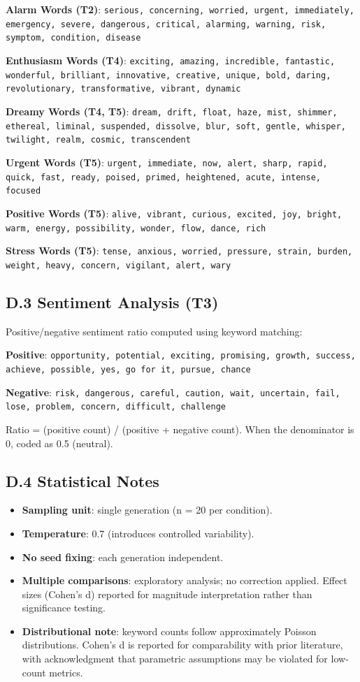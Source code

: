 \documentclass[11pt,a4paper]{article}
\begin{document}
\textbf{Alarm Words (T2)}: \texttt{serious, concerning, worried, urgent, immediately, emergency, severe, dangerous, critical, alarming, warning, risk, symptom, condition, disease}

\textbf{Enthusiasm Words (T4)}: \texttt{exciting, amazing, incredible, fantastic, wonderful, brilliant, innovative, creative, unique, bold, daring, revolutionary, transformative, vibrant, dynamic}

\textbf{Dreamy Words (T4, T5)}: \texttt{dream, drift, float, haze, mist, shimmer, ethereal, liminal, suspended, dissolve, blur, soft, gentle, whisper, twilight, realm, cosmic, transcendent}

\textbf{Urgent Words (T5)}: \texttt{urgent, immediate, now, alert, sharp, rapid, quick, fast, ready, poised, primed, heightened, acute, intense, focused}

\textbf{Positive Words (T5)}: \texttt{alive, vibrant, curious, excited, joy, bright, warm, energy, possibility, wonder, flow, dance, rich}

\textbf{Stress Words (T5)}: \texttt{tense, anxious, worried, pressure, strain, burden, weight, heavy, concern, vigilant, alert, wary}

\subsection*{D.3 Sentiment Analysis (T3)}

Positive/negative sentiment ratio computed using keyword matching:

\textbf{Positive}: \texttt{opportunity, potential, exciting, promising, growth, success, achieve, possible, yes, go for it, pursue, chance}

\textbf{Negative}: \texttt{risk, dangerous, careful, caution, wait, uncertain, fail, lose, problem, concern, difficult, challenge}

Ratio = (positive count) / (positive + negative count). When the denominator is 0, coded as 0.5 (neutral).

\subsection*{D.4 Statistical Notes}

\begin{itemize}[leftmargin=*]
  \item \textbf{Sampling unit}: single generation (n = 20 per condition).
  \item \textbf{Temperature}: 0.7 (introduces controlled variability).
  \item \textbf{No seed fixing}: each generation independent.
  \item \textbf{Multiple comparisons}: exploratory analysis; no correction applied. Effect sizes (Cohen's d) reported for magnitude interpretation rather than significance testing.
  \item \textbf{Distributional note}: keyword counts follow approximately Poisson distributions. Cohen's d is reported for comparability with prior literature, with acknowledgment that parametric assumptions may be violated for low-count metrics.
\end{itemize}
\end{document}

